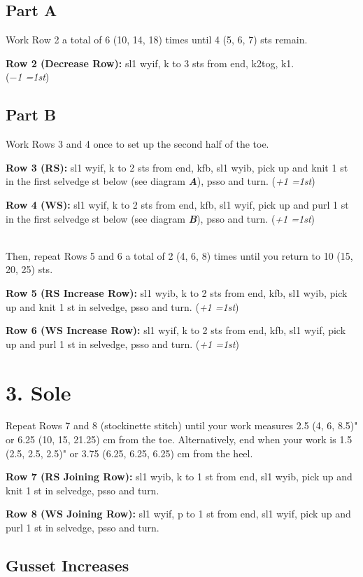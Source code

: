 \documentclass[12pt]{article}
\newcommand{\vocab}[1]{\emph{\textbf{#1}}} %
\newcommand{\rowDir}[1]{\textbf{#1:}} %
\newcommand{\increase}[1]{(\emph{+#1 
	\ifnum#1=1{st}\else{sts}\fi})}
\newcommand{\decrease}[1]{(\emph{$-$#1
	\ifnum#1=1{st}\else{sts}\fi})}
\begin{document}
\subsection*{Part A}
Work Row 2 a total of 6 (10, 14, 18) times 
until 4 (5, 6, 7) sts remain.

\rowDir{Row 2 (Decrease Row)} sl1 wyif, k to 3 sts from end, k2tog, k1. \\\decrease{1}

\subsection*{Part B}

Work Rows 3 and 4 once to set up the second half of the toe.

\rowDir{Row 3 (RS)} sl1 wyif, k to 2 sts from end, kfb, sl1 wyib, pick up and knit 1 st in the first selvedge st below (see diagram \vocab{A}), psso and turn. \increase{1}

\rowDir{Row 4 (WS)} sl1 wyif, k to 2 sts from end, kfb, sl1 wyif, pick up and purl 1 st in the first selvedge st below (see diagram \vocab{B}), psso and turn. \increase{1}

~\\
Then, repeat Rows 5 and 6 a total of 2 (4, 6, 8) times 
until you return to 10 (15, 20, 25) sts.

\rowDir{Row 5 (RS Increase Row)} sl1 wyib, k to 2 sts from end, kfb, sl1 wyib, pick up and knit 1 st in selvedge, psso and turn. \increase{1}

\rowDir{Row 6 (WS Increase Row)} sl1 wyif, k to 2 sts from end, kfb, sl1 wyif, pick up and purl 1 st in selvedge, psso and turn. \increase{1}

\section*{3. Sole}

Repeat Rows 7 and 8 (stockinette stitch) until your work measures 2.5 (4, 6, 8.5)" or 6.25 (10, 15, 21.25) cm
from the toe. Alternatively, end when your work is 1.5 (2.5, 2.5, 2.5)" or 3.75 (6.25, 6.25, 6.25) cm from the heel.

\rowDir{Row 7 (RS Joining Row)} sl1 wyib, k to 1 st from end, sl1 wyib, pick up and knit 1 st in selvedge, psso and turn.

\rowDir{Row 8 (WS Joining Row)} sl1 wyif, p to 1 st from end, sl1 wyif, pick up and purl 1 st in selvedge, psso and turn.

\pagebreak
\subsection*{Gusset Increases} 
\end{document}
